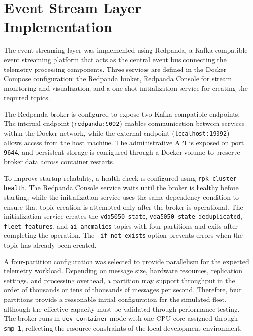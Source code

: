 \section{Event Stream Layer Implementation}

The event streaming layer was implemented using Redpanda, a Kafka-compatible
event streaming platform that acts as the central event bus connecting the
telemetry processing components. Three services are defined in the Docker
Compose configuration: the Redpanda broker, Redpanda Console for stream
monitoring and visualization, and a one-shot initialization service for
creating the required topics.

The Redpanda broker is configured to expose two Kafka-compatible endpoints.
The internal endpoint (\texttt{redpanda:9092}) enables communication between
services within the Docker network, while the external endpoint
(\texttt{localhost:19092}) allows access from the host machine. The
administrative API is exposed on port \texttt{9644}, and persistent storage
is configured through a Docker volume to preserve broker data across
container restarts.

To improve startup reliability, a health check is configured using
\texttt{rpk cluster health}. The Redpanda Console service waits until the
broker is healthy before starting, while the initialization service uses
the same dependency condition to ensure that topic creation is attempted
only after the broker is operational. The initialization service creates
the \texttt{vda5050-state}, \texttt{vda5050-state-deduplicated}, \texttt{fleet-features}, and \texttt{ai-anomalies} topics with four partitions and exits after
completing the operation. The \texttt{--if-not-exists} option prevents
errors when the topic has already been created.

A four-partition configuration was selected to provide parallelism for
the expected telemetry workload. Depending on message size, hardware
resources, replication settings, and processing overhead, a partition
may support throughput in the order of thousands or tens of thousands
of messages per second. Therefore, four partitions provide a reasonable
initial configuration for the simulated fleet, although the effective
capacity must be validated through performance testing. The broker runs
in \texttt{dev-container} mode with one CPU core assigned through
\texttt{--smp 1}, reflecting the resource constraints of the local
development environment.


